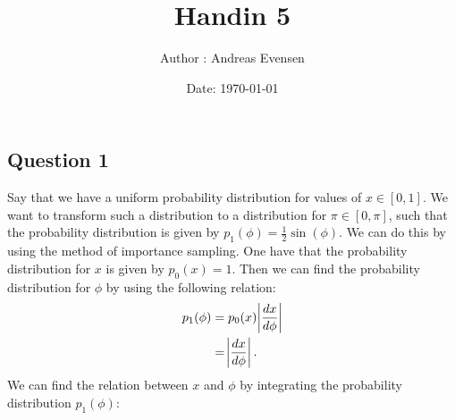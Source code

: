 \documentclass[a4paper]{article}
\title{Handin 5}
\author{Author : Andreas Evensen}
\date{Date: \today}
\begin{document}
\maketitle

\subsection*{Question 1}
\begin{comment}
We have the following probability distribution:
\begin{figure}[H]
    \centering
    \begin{tikzpicture}
        \draw (-0.5,0) -- (4, 0) node[below] {$\phi$};
        \draw[color = red] plot[domain = 0:pi, samples = 100] (\x, {1/2 * sin(\x r)}) node[left, pos = 0.5] {$p_1(\phi)=\frac{1}{2}\sin(\phi)$};
    \end{tikzpicture}
    \caption{Probability distribution 1}
\end{figure}\noindent
We do this by finding:
\begin{align*}
    u(\phi) &= \int_{\phi_0}^\phi p_1(\phi')d{\phi'}\\
    &= \int_{\phi_0}^\phi \frac{1}{2}\sin(\phi')d{\phi'}\\
    &= -\frac{1}{2}\cos(\phi')\Big|_{\phi_0}^\phi\\
    &= \frac{1}{2}\left(\cos(\phi_0) - \cos(\phi)\right).
\end{align*}We now want to find the inverse of $u(\phi)$, which is given by:
\begin{align*}
    2u &= \cos(\phi_0) - \cos(\phi)\\
    \cos(\phi) &= \cos(\phi_0) - 2u\\
    \phi &= \arccos(\cos(\phi_0) - 2u).
\end{align*}Thus, any random number $u$ describes a random value $\phi$. 
\end{comment}
Say that we have a uniform probability distribution for values of $x\in[0,1]$.
We want to transform such a distribution to a distribution for $\pi\in[0, \pi]$, such that the probability distribution is given by $p_1(\phi) = \frac{1}{2}\sin(\phi)$.
We can do this by using the method of importance sampling.
One have that the probability distribution for $x$ is given by $p_0(x) = 1$.
Then we can find the probability distribution for $\phi$ by using the following relation:
\begin{align*}
    p_1(\phi) &= p_0(x)\abs{\frac{dx}{d\phi}}\\
    &= \abs{\frac{dx}{d\phi}}.
\end{align*}We can find the relation between $x$ and $\phi$ by integrating the probability distribution $p_1(\phi)$:
\end{document}
